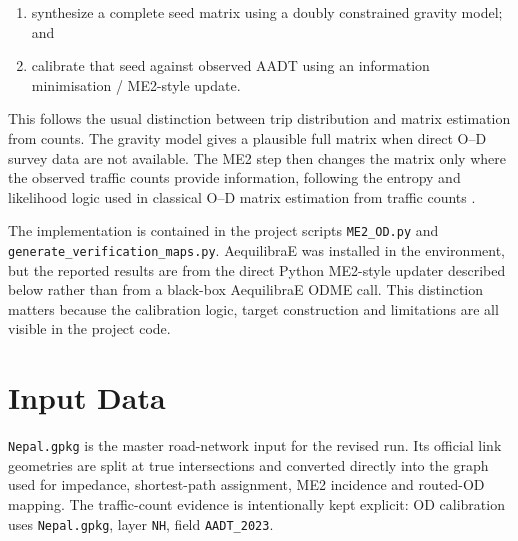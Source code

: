 \documentclass[11pt,a4paper]{article}
\newcommand{\od}{O--D}
\begin{document}
\begin{enumerate}
    \item synthesize a complete seed matrix using a doubly constrained gravity
    model; and
    \item calibrate that seed against observed AADT using an information
    minimisation / ME2-style update.
\end{enumerate}

This follows the usual distinction between trip distribution and matrix
estimation from counts. The gravity model gives a plausible full matrix when
direct \od{} survey data are not available. The ME2 step then changes the matrix
only where the observed traffic counts provide information, following the
entropy and likelihood logic used in classical \od{} matrix estimation from
traffic counts \cite{wilson1967,vanzuylen1980,spiess1987}.

The implementation is contained in the project scripts
\texttt{ME2\_OD.py} and \texttt{generate\_verification\_maps.py}. AequilibraE
was installed in the environment, but the reported results are from the direct
Python ME2-style updater described below rather than from a black-box
AequilibraE ODME call. This distinction matters because the calibration logic,
target construction and limitations are all visible in the project code.

\section{Input Data}

\texttt{Nepal.gpkg} is the master road-network input for the revised run.
Its official link geometries are split at true intersections and converted
directly into the graph used for impedance, shortest-path assignment, ME2
incidence and routed-OD mapping. The traffic-count evidence is intentionally
kept explicit: OD calibration uses \texttt{Nepal.gpkg}, layer
\texttt{NH}, field \texttt{AADT\_2023}.
\end{document}
